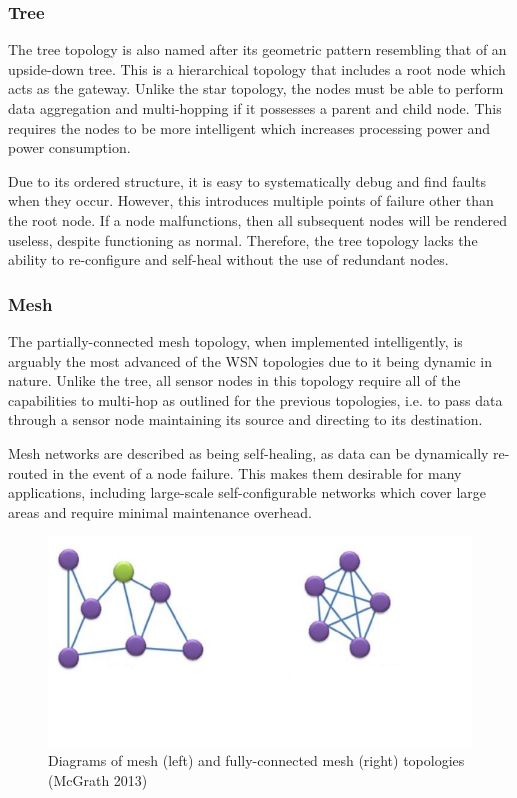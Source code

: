 \subsubsection{Tree}


The tree topology is also named after its geometric pattern resembling that of an upside-down tree. This is a hierarchical topology that includes a root node which acts as the gateway. Unlike the star topology, the nodes must be able to perform data aggregation and multi-hopping if it possesses a parent and child node. This requires the nodes to be more intelligent which increases processing power and power consumption.

Due to its ordered structure, it is easy to systematically debug and find faults when they occur. However, this introduces multiple points of failure other than the root node. If a node malfunctions, then all subsequent nodes will be rendered useless, despite functioning as normal. Therefore, the tree topology lacks the ability to re-configure and self-heal without the use of redundant nodes.


\subsubsection{Mesh}

The partially-connected mesh topology, when implemented intelligently, is arguably the most advanced of the WSN topologies due to it being dynamic in nature. Unlike the tree, all sensor nodes in this topology require all of the capabilities to multi-hop as outlined for the previous topologies, i.e. to pass data through a sensor node maintaining its source and directing to its destination.

Mesh networks are described as being self-healing, as data can be dynamically re-routed in the event of a node failure. This makes them desirable for many applications, including large-scale self-configurable networks which cover large areas and require minimal maintenance overhead.

\begin{figure}[h]
\centering
\includegraphics{Figures/mesh-fully-connected-mesh-topology.JPG}
\decoRule
\caption[Mesh and fully-connected mesh network topologies]{Diagrams of mesh (left) and fully-connected mesh (right) topologies (McGrath 2013)}
\label{fig:StarTreeTopology}
\end{figure}

